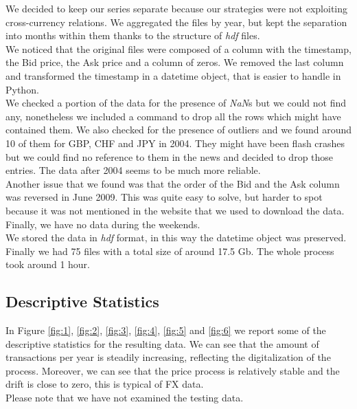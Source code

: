\documentclass[a4paper]{article}
\begin{document}
We decided to keep our series separate because our strategies were not exploiting cross-currency relations. We aggregated the files by year, but kept the separation into months within them thanks to the structure of \emph{hdf} files.\\
We noticed that the original files were composed of a column with the timestamp, the Bid price, the Ask price and a column of zeros. We removed the last column and transformed the timestamp in a datetime object, that is easier to handle in Python.\\
We checked a portion of the data for the presence of \emph{NaN}s but we could not find any, nonetheless we included a command to drop all the rows which might have contained them. We also checked for the presence of outliers and we found around 10 of them for GBP, CHF and JPY in 2004. They might have been flash crashes but we could find no reference to them in the news and decided to drop those entries. The data after 2004 seems to be much more reliable.\\
Another issue that we found was that the order of the Bid and the Ask column was reversed in June 2009. This was quite easy to solve, but harder to spot because it was not mentioned in the website that we used to download the data.\\
Finally, we have no data during the weekends.\\
We stored the data in \emph{hdf} format, in this way the datetime object was preserved. Finally we had 75 files with a total size of around 17.5 Gb. The whole process took around 1 hour.

\subsection{Descriptive Statistics} 

In Figure \ref{fig:1}, \ref{fig:2}, \ref{fig:3}, \ref{fig:4}, \ref{fig:5} and \ref{fig:6} we report some of the descriptive statistics for the resulting data. We can see that the amount of transactions per year is steadily increasing, reflecting the digitalization of the process. Moreover, we can see that the price process is relatively stable and the drift is close to zero, this is typical of FX data.\\
Please note that we have not examined the testing data.
\end{document}
